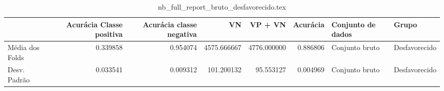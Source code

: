 \begin{table}
\centering
\caption{nb_full_report_bruto_desfavorecido.tex}
\label{nb_full_report_bruto_desfavorecido.tex}
\begin{tabular}{lrrrrrll}
\toprule
{}              &  Acurácia Classe positiva &  Acurácia classe negativa &          VN  &     VP + VN  &  Acurácia & Conjunto de dados &          Grupo \\
\midrule
Média dos Folds &                  0.339858 &                  0.954074 &  4575.666667 &  4776.000000 &  0.886806 &    Conjunto bruto &  Desfavorecido \\
Desv. Padrão    &                  0.033541 &                  0.009312 &   101.200132 &    95.553127 &  0.004969 &    Conjunto bruto &  Desfavorecido \\
\bottomrule
\end{tabular}
\end{table}

